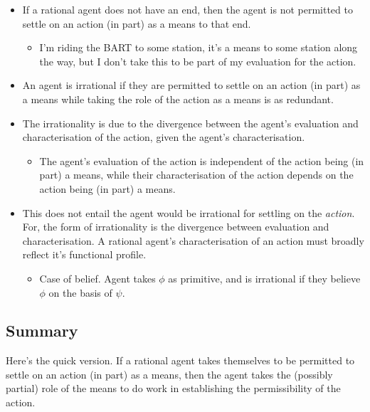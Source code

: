 \documentclass[10pt]{article}
\newcommand{\hozlinedash}[0]{%
  \noindent\hdashrule[0.5ex][c]{\textwidth}{.1pt}{2.5pt}
}
\begin{document}
\begin{itemize}
\item {\color{red} If a rational agent does not have an end, then the agent is not permitted to settle on an action (in part) as a means to that end.}
  \begin{itemize}
  \item I'm riding the BART to some station, it's a means to some station along the way, but I don't take this to be part of my evaluation for the action.
  \end{itemize}
\item An agent is irrational if they are permitted to settle on an action (in part) as a means while taking the role of the action as a means is as redundant.
\item The irrationality is due to the divergence between the agent's evaluation and characterisation of the action, given the agent's characterisation.
  \begin{itemize}
  \item The agent's evaluation of the action is independent of the action being (in part) a means, while their characterisation of the action depends on the action being (in part) a means.
  \end{itemize}
\item This does not entail the agent would be irrational for settling on the \emph{action}.
  For, the form of irrationality is the divergence between evaluation and characterisation.
  A rational agent's characterisation of an action must broadly reflect it's functional profile.
  \begin{itemize}
  \item Case of belief.
    Agent takes \(\phi\) as primitive, and is irrational if they believe \(\phi\) on the basis of \(\psi\).
  \end{itemize}
\end{itemize}


\hozlinedash



\subsection{Summary}
\label{sec:summary-1}

Here's the quick version.
If a rational agent takes themselves to be permitted to settle on an action (in part) as a means, then the agent takes the (possibly partial) role of the means to do work in establishing the permissibility of the action.
\end{document}
